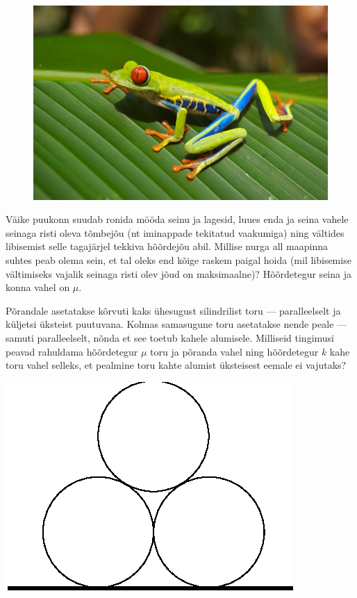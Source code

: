 \documentclass[10pt]{article}
\begin{document}
{
\begin{figure}
	\vspace{-1.8ex}
	\includegraphics[width=\linewidth]{2010-lahg-09-Red_eyed_tree_frog}
	\vspace{-4ex}
\end{figure}
Väike puukonn suudab ronida mööda seinu ja lagesid, luues enda ja seina vahele 
seinaga risti oleva tõmbejõu (nt iminappade tekitatud vaakumiga) ning vältides libisemist 
selle tagajärjel tekkiva hõõrdejõu abil.
Millise nurga all maapinna suhtes peab olema sein, et tal oleks end kõige raskem paigal hoida 
(mil libisemise vältimiseks vajalik seinaga risti olev jõud on maksimaalne)?
Hõõrdetegur seina ja konna vahel on $\mu$.
\probend
\bigskip


Põrandale asetatakse kõrvuti kaks ühesugust silindrilist toru --- paralleelselt ja küljetsi üksteist puutuvana. Kolmas samasugune toru asetatakse nende peale --- samuti paralleelselt, nõnda et see toetub kahele alumisele.
Milliseid tingimusi peavad rahuldama hõõrdetegur $\mu$ toru ja põranda vahel ning hõõrdetegur $k$ kahe toru vahel
selleks, et pealmine toru kahte alumist üksteisest eemale ei vajutaks?

\begin{center}
	\includegraphics[width=0.3\linewidth]{2010-v2g-10-torud.eps}
\end{center}
\probend
\bigskip

}
\end{document}
